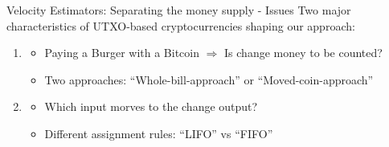 \documentclass[]{beamer}
\begin{document}

\begin{frame}{Velocity Estimators: Separating the money supply - Issues}
  Two major characteristics of UTXO-based cryptocurrencies shaping our approach: %
  \begin{enumerate}
  \item {}
    \begin{itemize}
    \item  Paying a Burger with a Bitcoin \(\Rightarrow\) Is change money to be counted?
    \item Two approaches: ``Whole-bill-approach'' or ``Moved-coin-approach''
    \end{itemize}
  \item {}
    \begin{itemize}
    \item Which input morves to the change output?
    \item Different assignment rules: ``LIFO'' vs ``FIFO''
    \end{itemize}
  \end{enumerate}
\end{frame}




\end{document}

